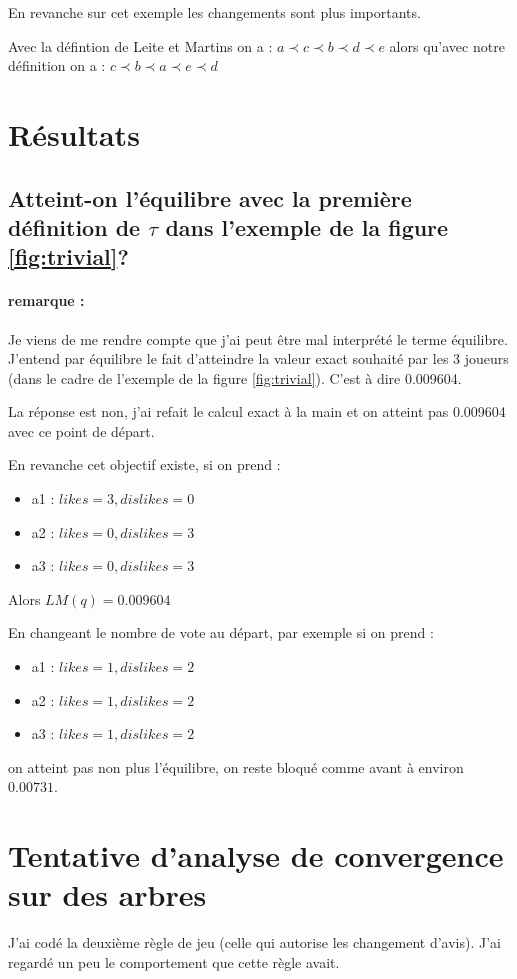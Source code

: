 \documentclass[12pt]{article}
\theoremstyle{defi}
\theoremstyle{not}
\theoremstyle{prob}
\begin{document}
En revanche sur cet exemple les changements sont plus importants.

Avec la défintion de Leite et Martins on a : $a \prec c \prec b \prec d \prec e$ alors qu'avec notre définition on a : $c \prec b \prec a \prec e \prec d$

\color{blue}
\section{Résultats}
  \subsection{Atteint-on l'équilibre avec la première définition de $\tau$ dans l'exemple de la figure \ref{fig:trivial}?}

    \paragraph{remarque :}Je viens de me rendre compte que j'ai peut être mal interprété le terme équilibre. J'entend par équilibre le fait d'atteindre la valeur exact souhaité par les 3 joueurs (dans le cadre de l'exemple de la figure \ref{fig:trivial}). C'est à dire 0.009604.

    La réponse est non, j'ai refait le calcul exact à la main et on atteint pas 0.009604 avec ce point de départ.

    En revanche cet objectif existe, si on prend :
    \begin{itemize}
      \item a1 : $likes = 3, dislikes = 0$
      \item a2 : $likes = 0, dislikes = 3$
      \item a3 : $likes = 0, dislikes = 3$
    \end{itemize}
    Alors $LM(q) = 0.009604$

    En changeant le nombre de vote au départ, par exemple si on prend :
    \begin{itemize}
      \item a1 : $likes = 1, dislikes = 2$
      \item a2 : $likes = 1, dislikes = 2$
      \item a3 : $likes = 1, dislikes = 2$
    \end{itemize}

    on atteint pas non plus l'équilibre, on reste bloqué comme avant à environ $0.00731$.

\section{Tentative d'analyse de convergence sur des arbres}
  J'ai codé la deuxième règle de jeu (celle qui autorise les changement d'avis). J'ai regardé un peu le comportement que cette règle avait.
\end{document}
